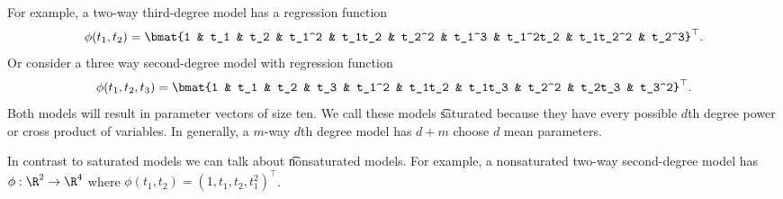 For example, a two-way third-degree model has a regression function
\[
\phi (t_1, t_2) = \bmat{1 & t_1 & t_2 & t_1^2 & t_1t_2 & t_2^2 & t_1^3 & t_1^2t_2 & t_1t_2^2 & t_2^3}^\top .
\]
Or consider a three way second-degree model with regression function
\[
\phi (t_1, t_2, t_3) = \bmat{1 & t_1 & t_2 & t_3 & t_1^2 & t_1t_2 & t_1t_3 & t_2^2 & t_2t_3 & t_3^2}^\top .
\]
Both models will result in parameter vectors of size ten.
We call these models \t{saturated} because they have every possible $d$th degree power or cross product of variables.
In generally, a $m$-way $d$th degree model has $d+m$ choose $d$ mean parameters.

In contrast to saturated models we can talk about \t{nonsaturated} models.
For example, a nonsaturated two-way second-degree model has $\phi : \R ^2 \to \R ^4$ where $\phi (t_1, t_2) = (1 , t_1 , t_2 , t_1^2)^\top $.
